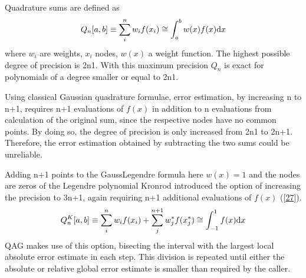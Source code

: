 \documentclass[letterpaper,10pt,english]{sphinxmanual}
\begin{document}
				\sphinxAtStartPar
				Quadrature sums are defined as
				\begin{equation*}
				\begin{split}Q_n[a,b] \equiv \sum_i^nw_if(x_i) \cong \int_a^bw(x)f(x)\textup{d}x\end{split}
				\end{equation*}
				\sphinxAtStartPar
				where \(w_i\) are weights, \(x_i\) nodes, \(w(x)\) a weight function.
				The highest possible degree of precision is 2n\sphinxhyphen{}1. With this maximum precision \(Q_n\) is exact for polynomials of a degree smaller or equal to 2n\sphinxhyphen{}1.
				
				\sphinxAtStartPar
				Using classical Gaussian quadrature formulae, error estimation, by increasing n to n+1, requires n+1 evaluations of \(f(x)\) in addition to n evaluations from
				calculation of the original sum, since the respective nodes have no common points. By doing so, the degree of precision is only increased from 2n\sphinxhyphen{}1 to 2n+1.
				Therefore, the error estimation obtained by subtracting the two sums could be unreliable.
				
				\sphinxAtStartPar
				Adding n+1 points to the Gauss\sphinxhyphen{}Legendre formula \sphinxhyphen{} here \(w(x)=1\) and the nodes are zeros of the Legendre polynomial \sphinxhyphen{}
				Kronrod introduced the option of increasing the precision to 3n+1, again requiring n+1 additional evaluations of \(f(x)\) ({[}\hyperlink{cite.NBodySimulation/Appendix:id26}{27}{]}).
				\begin{equation*}
				\begin{split}Q_n^K[a,b] \equiv \sum_i^nw_if(x_i) + \sum_j^{n+1}w_j^*f(x_j^*) \cong \int_{-1}^1f(x)\textup{d}x\end{split}
				\end{equation*}
				\sphinxAtStartPar
				QAG makes use of this option, bisecting the interval with the largest local absolute error estimate in each step.
				This division is repeated until either the absolute or relative global error estimate is smaller than required by the caller.
			
			
\end{document}
